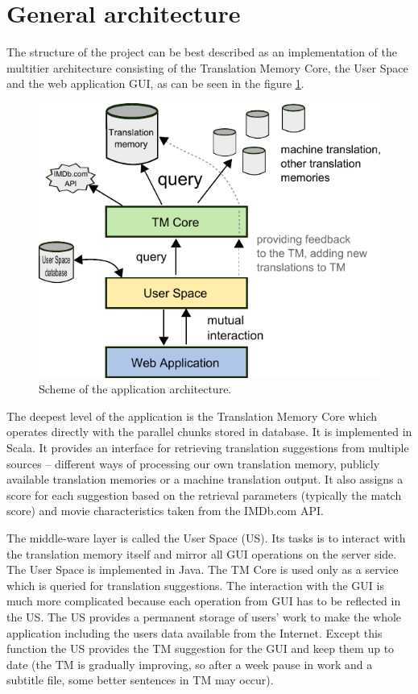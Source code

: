 \section{General architecture}
The structure of the project can be best described as an implementation of the multitier architecture consisting of the Translation Memory Core, the User Space and the web application GUI, as can be seen in the figure \ref{projectStructure:layers}.

\begin{figure}[h]
\begin{center}
\includegraphics{figures/scheme.pdf}
\end{center}
\caption{Scheme of the application architecture.}\label{projectStructure:layers}
\end{figure}

The deepest level of the application is the Translation Memory Core which operates directly with the parallel chunks stored in database. It is implemented in Scala. It provides an interface for retrieving translation suggestions from multiple sources -- different ways of processing our own translation memory, publicly available translation memories or a machine translation output. It also assigns a score for each suggestion based on the retrieval parameters (typically the match score) and movie characteristics taken from the IMDb.com API.

The middle-ware layer is called the User Space (US). Its tasks is to interact with the translation memory itself and mirror all GUI operations on the server side. The User Space is implemented in Java. The TM Core is used only as a service which is queried for translation suggestions. The interaction with the GUI is much more complicated because each operation from GUI has to be reflected in the US. The US provides a permanent storage of users' work to make the whole application including the users data available from the Internet. Except this function the US provides the TM suggestion for the GUI and keep them up to date (the TM is gradually improving, so after a week pause in work and a subtitle file, some better sentences in TM may occur).

